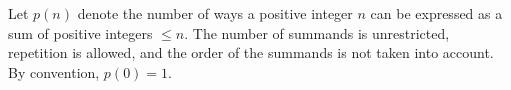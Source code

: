 Let $p(n)$ denote the number of ways a positive integer $n$ can be expressed as a sum of positive integers $\leq n$. The number of summands is unrestricted, repetition is allowed, and the order of the summands is not taken into account. By convention, $p(0) = 1$.
